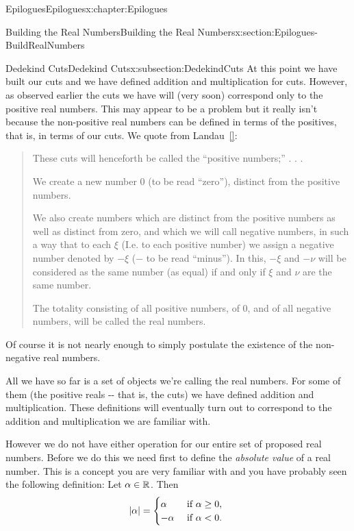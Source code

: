 \begin{chapterptx}{Epilogues}{}{Epilogues}{}{}{x:chapter:Epilogues}
\begin{sectionptx}{Building the Real Numbers}{}{Building the Real Numbers}{}{}{x:section:Epilogues-BuildRealNumbers}
\begin{subsectionptx}{Dedekind Cuts}{}{Dedekind Cuts}{}{}{x:subsection:DedekindCuts}
			At this point we have built our cuts and we have defined addition and multiplication for cuts. However, as observed earlier the cuts we have will (very soon) correspond only to the positive real numbers. This may appear to be a problem but it really isn't because the non-positive real numbers can be defined in terms of the positives, that is, in terms of our cuts. We quote from Landau~\hyperlink{x:biblio:landau66__found_analy}{[{}]}:%
			\begin{quote}%
				These cuts will henceforth be called the ``positive numbers;''  .  .  .%
				\par
				We create a new number \(0\) (to be read ``zero''), distinct from the positive numbers.%
				\par
				We also create numbers which are distinct from the positive numbers as well as distinct from zero, and which we will call negative numbers, in such a way that to each \(\xi\) (I.e. to each positive number) we assign a negative number denoted by \(-\xi\) (\(-\) to be read ``minus''). In this, \(-\xi\) and \(-\nu\) will be considered as the same number (as equal) if and only if \(\xi\) and \(\nu\) are the same number.%
				\par
				The totality consisting of all positive numbers, of \(0\), and of all negative numbers, will be called the real numbers.%
			\end{quote}
			Of course it is not nearly enough to simply postulate the existence of the non-negative real numbers.%
			\par
			All we have so far is a set of objects we're calling the real numbers.  For some of them (the positive reals -{}-{} that is, the cuts) we have defined addition and multiplication. These definitions will eventually turn out to correspond to the addition and multiplication we are familiar with.%
			\par
			However we do not have either operation for our entire set of proposed real numbers. Before we do this we need first to define the \emph{absolute value} of a real number. This is a concept you are very familiar with and you have probably seen the following definition: Let \(\alpha\in\mathbb {R}\). Then%
			\begin{equation*}
				\left|\alpha\right| = \begin{cases}\alpha&  \text{ if \(\alpha\ge0,\) } \\ -\alpha&  \text{ if \(\alpha<0.\) } \end{cases}
			\end{equation*}

\end{subsectionptx}
\end{sectionptx}
\end{chapterptx}

